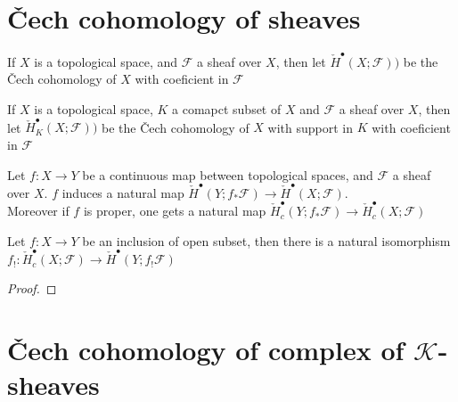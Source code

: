 \section{\v{C}ech cohomology of sheaves}

\begin{definition}\label{def:chech_of_sh}
    If $X$ is a topological space, and $\mathcal{F}$ a sheaf over $X$, then let $\check{H}^{\bullet}(X;\mathcal{F}))$ be the \v{C}ech cohomology of $X$ with coeficient in $\mathcal{F}$
\end{definition}

\begin{definition}\label{def:chech_of_compact_sup_of_sh}
    If $X$ is a topological space, $K$ a comapct subset of $X$ and $\mathcal{F}$ a sheaf over $X$, then let $\check{H}_K^{\bullet}(X;\mathcal{F}))$ be the \v{C}ech cohomology of $X$ with support in $K$ with coeficient in $\mathcal{F}$
\end{definition}

\begin{definition}\label{def:pullback_for_chech}
    Let $f:X\to Y$ be a continuous map between topological spaces, and $\mathcal{F}$ a sheaf over $X$. $f$ induces a natural map $\check{H}^{\bullet}(Y;f_*\mathcal{F})\to \check{H}^{\bullet}(X;\mathcal{F})$.\\

    Moreover if $f$ is proper, one gets a natural map $\check{H}_c^{\bullet}(Y;f_*\mathcal{F})\to \check{H}_c^{\bullet}(X;\mathcal{F})$

\end{definition}

\begin{lemma}\label{lem:chech_comm_with_exceptional}
    Let $f:X\to Y$ be an inclusion of open subset, then there is a natural isomorphism $f_!:\check{H}_c^{\bullet}(X;\mathcal{F})\to \check{H}^{\bullet}(Y;f_!\mathcal{F})$
\end{lemma}

\begin{proof}

\end{proof}

\section{\v{C}ech cohomology of complex of $\mathcal{K}$-sheaves}

